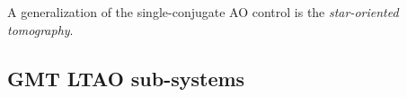 \mbox{}

A generalization of the single-conjugate AO control is the \emph{star-oriented
tomography}. 



\subsection{GMT LTAO sub-systems}
\label{subsec:ltao-sub-systems}

\mbox{}

